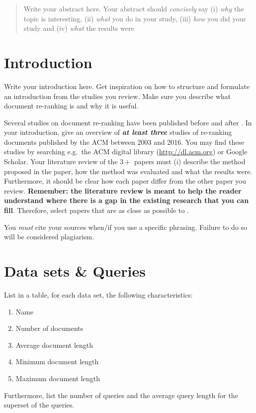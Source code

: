 \documentclass{sig-alternate}
\begin{document}
\begin{abstract}
Write your abstract here. Your abstract should \emph{concisely} say (i) \emph{why} the topic is interesting, (ii) \emph{what} you do in your study, (iii) \emph{how} you did your study and (iv) \emph{what} the results were
\end{abstract}

\section{Introduction}
Write your introduction here. Get inspiration on how to structure and formulate an introduction from the studies you review. Make sure you describe what document re-ranking is and why it is useful.

Several studies on document re-ranking have been published before and after \cite{woo2010achieving}. In your introduction, give an overview of \textbf{\emph{at least three}} studies of re-ranking documents published by the ACM between 2003 and 2016. You may find these studies by searching e.g.\ the ACM digital library (\url{http://dl.acm.org}) or Google Scholar. Your literature review of the $3+$ papers must (i) describe the method proposed in the paper, how the method was evaluated and what the results were. Furthermore, it should be clear how each paper differ from the other paper you review. \textbf{Remember: the literature review is meant to help the reader understand where there is a gap in the existing research that you can fill}. Therefore, select papers that are as close as possible to \cite{woo2010achieving}.

You \emph{must} cite your sources when/if you use a specific phrasing. Failure to do so will be considered plagiarism.

\section{Data sets \& Queries}
List in a table, for each data set, the following characteristics:
\begin{enumerate}
\item Name
\item Number of documents
\item Average document length
\item Minimum document length
\item Maximum document length
\end{enumerate}

Furthermore, list the number of queries and the average query length for the superset of the queries.
\end{document}
